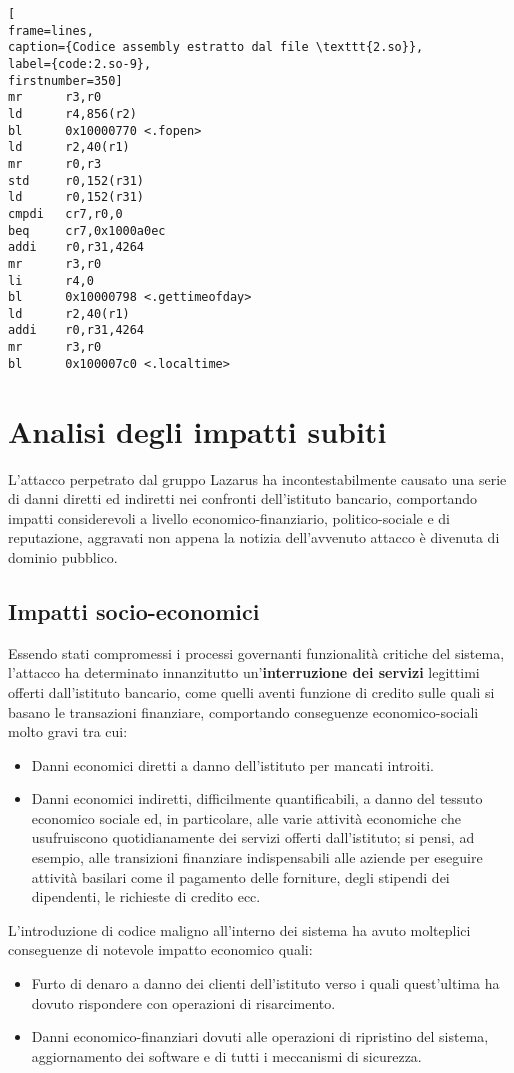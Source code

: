 \documentclass[10pt,a4paper, titlepage]{report}
\begin{document}
\begin{lstlisting}[
frame=lines, 
caption={Codice assembly estratto dal file \texttt{2.so}}, 
label={code:2.so-9},
firstnumber=350]
mr      r3,r0
ld      r4,856(r2)
bl      0x10000770 <.fopen>
ld      r2,40(r1)
mr      r0,r3
std     r0,152(r31)
ld      r0,152(r31)
cmpdi   cr7,r0,0
beq     cr7,0x1000a0ec
addi    r0,r31,4264
mr      r3,r0
li      r4,0
bl      0x10000798 <.gettimeofday>
ld      r2,40(r1)
addi    r0,r31,4264
mr      r3,r0
bl      0x100007c0 <.localtime>
\end{lstlisting}

\newpage
\chapter{Analisi degli impatti subiti}

L'attacco perpetrato dal gruppo Lazarus ha incontestabilmente causato una serie di danni diretti ed indiretti nei confronti dell'istituto bancario, comportando impatti considerevoli a livello economico-finanziario, politico-sociale e di reputazione, aggravati non appena la notizia dell'avvenuto attacco è divenuta di dominio pubblico.

\section{Impatti socio-economici}

Essendo stati compromessi i processi governanti funzionalità critiche del sistema, l'attacco ha determinato innanzitutto un'\textbf{interruzione dei servizi} legittimi offerti dall'istituto bancario, come quelli aventi funzione di credito sulle quali si basano le transazioni finanziare, comportando conseguenze economico-sociali molto gravi tra cui:
\begin{itemize}
\item Danni economici diretti a danno dell'istituto per mancati introiti.
\item Danni economici indiretti, difficilmente quantificabili, a danno del tessuto economico sociale ed, in particolare, alle varie attività economiche che usufruiscono quotidianamente dei servizi offerti dall'istituto; si pensi, ad esempio, alle transizioni finanziare indispensabili  alle aziende per eseguire attività basilari come il pagamento delle forniture, degli stipendi dei dipendenti, le richieste di credito ecc. 
\end{itemize}

L'introduzione di codice maligno all'interno dei sistema ha avuto molteplici conseguenze di notevole impatto economico quali:
\begin{itemize}
\item Furto di denaro a danno dei clienti dell'istituto verso i quali quest'ultima ha dovuto rispondere con operazioni di risarcimento. 
\item Danni economico-finanziari dovuti alle operazioni di ripristino del sistema, aggiornamento dei software e di tutti i meccanismi di sicurezza.
\end{itemize}
\end{document}
